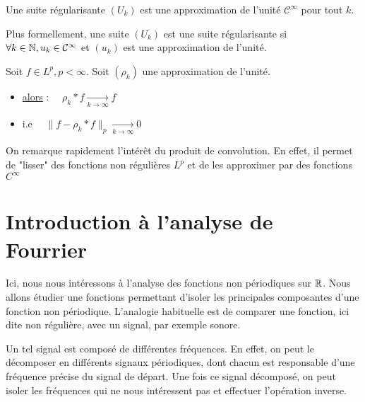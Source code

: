 \begin{definition}
    Une suite régularisante $(U_k)$ est une approximation de l'unité $\mathcal{C}^\infty$ pour tout $k$. 
    \vspace{0.5cm}

    Plus formellement, une suite $(U_k)$ est une suite régularisante si $ \forall k \in \mathbb{N}, u_k \in \mathcal{C}^\infty$ 
    et $(u_k)$ est une approximation de l'unité. 
\end{definition}

\begin{theorem}
    Soit $f \in {L}^p, p < \infty$. Soit $(\rho_k)$ une approximation de l'unité. 
    \begin{itemize}
        \item[]\underline{alors} : $ \quad \rho_k \ast f \underset{k \to \infty}{\longrightarrow} f$ 
        \item[]i.e $ \quad  \|  f - \rho_k \ast f \|_p \underset{k \to \infty}{\longrightarrow} 0$ 
    \end{itemize}
\end{theorem}

\begin{remark}
    On remarque rapidement l'intérêt du produit de convolution. 
    En effet, il permet de "lisser" des fonctions non régulières $L^p$ et de les approximer 
    par des fonctions $C^\infty$ 
\end{remark}


\section{Introduction à l'analyse de Fourrier}

Ici, nous nous intéressons à l'analyse des fonctions non périodiques sur $\mathbb{R}$. 
Nous allons étudier une fonctions permettant d'isoler les principales composantes d'une fonction non périodique. 
L'analogie habituelle est de comparer une fonction, ici dite non régulière, avec un signal, par exemple sonore. 

Un tel signal est composé de différentes fréquences. En effet, on peut le décomposer en différents signaux 
périodiques, dont chacun est responsable d'une fréquence précise du signal de départ. 
Une fois ce signal décomposé, on peut isoler les fréquences qui ne nous intéressent pas et effectuer l'opération inverse. 

